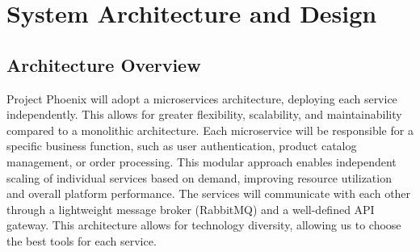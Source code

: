 \documentclass[11pt,a4paper,oneside]{article}
\begin{document}
\section{System Architecture and Design}

\subsection{Architecture Overview}

Project Phoenix will adopt a microservices architecture, deploying each service independently. This allows for greater flexibility, scalability, and maintainability compared to a monolithic architecture.  Each microservice will be responsible for a specific business function, such as user authentication, product catalog management, or order processing.  This modular approach enables independent scaling of individual services based on demand, improving resource utilization and overall platform performance.  The services will communicate with each other through a lightweight message broker (RabbitMQ) and a well-defined API gateway.  This architecture allows for technology diversity, allowing us to choose the best tools for each service.
\end{document}
